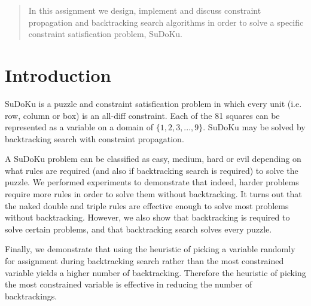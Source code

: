 \documentclass[12pt]{article}
\begin{document}
\maketitle

\begin{abstract}
In this assignment we design, implement and discuss constraint propagation and backtracking search algorithms in order to solve a specific constraint satisfication problem, SuDoKu. 
\end{abstract}

\section{Introduction}

SuDoKu is a puzzle and constraint satisfication problem in which every unit (i.e. row, column or box) is an all-diff constraint. Each of the 81 squares can be represented as a variable on a domain of $\{1, 2, 3, ..., 9\}$. SuDoKu may be solved by backtracking search with constraint propagation.

A SuDoKu problem can be classified as easy, medium, hard or evil depending on what rules are required (and also if backtracking search is required) to solve the puzzle. We performed experiments to demonstrate that indeed, harder problems require more rules in order to solve them without backtracking. It turns out that the naked double and triple rules are effective enough to solve most problems without backtracking. However, we also show that backtracking is required to solve certain problems, and that backtracking search solves every puzzle.

Finally, we demonstrate that using the heuristic of picking a variable randomly for assignment during backtracking search rather than the most constrained variable yields a higher number of backtracking. Therefore the heuristic of picking the most constrained variable is effective in reducing the number of backtrackings.







\end{document}
